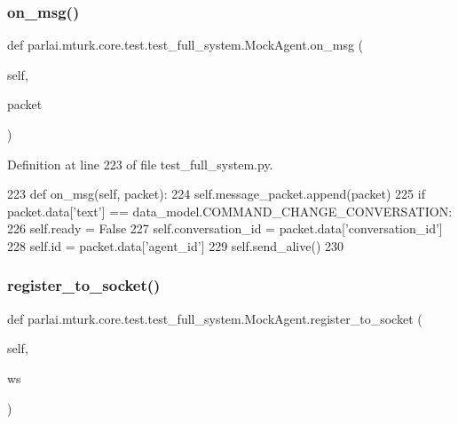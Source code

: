 \subsubsection{\texorpdfstring{on\+\_\+msg()}{on\_msg()}}
{\footnotesize\ttfamily def parlai.\+mturk.\+core.\+test.\+test\+\_\+full\+\_\+system.\+Mock\+Agent.\+on\+\_\+msg (\begin{DoxyParamCaption}\item[{}]{self,  }\item[{}]{packet }\end{DoxyParamCaption})}



Definition at line 223 of file test\+\_\+full\+\_\+system.\+py.


\begin{DoxyCode}
223     \textcolor{keyword}{def }on\_msg(self, packet):
224         self.message\_packet.append(packet)
225         \textcolor{keywordflow}{if} packet.data[\textcolor{stringliteral}{'text'}] == data\_model.COMMAND\_CHANGE\_CONVERSATION:
226             self.ready = \textcolor{keyword}{False}
227             self.conversation\_id = packet.data[\textcolor{stringliteral}{'conversation\_id'}]
228             self.id = packet.data[\textcolor{stringliteral}{'agent\_id'}]
229             self.send\_alive()
230 
\end{DoxyCode}
\mbox{\label{classparlai_1_1mturk_1_1core_1_1test_1_1test__full__system_1_1MockAgent_aa3aaa3fa10d7f1ca6a135bcd28e18be4}} 
\subsubsection{\texorpdfstring{register\+\_\+to\+\_\+socket()}{register\_to\_socket()}}
{\footnotesize\ttfamily def parlai.\+mturk.\+core.\+test.\+test\+\_\+full\+\_\+system.\+Mock\+Agent.\+register\+\_\+to\+\_\+socket (\begin{DoxyParamCaption}\item[{}]{self,  }\item[{}]{ws }\end{DoxyParamCaption})}



